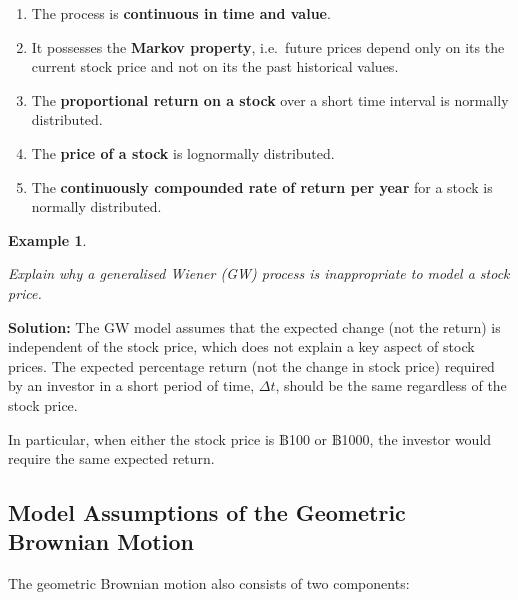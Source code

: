 \documentclass[
]{book}
\theoremstyle{definition}
\theoremstyle{definition}
\newtheorem{example}{Example}[chapter]
\theoremstyle{definition}
\theoremstyle{definition}
\theoremstyle{remark}
\begin{document}
\begin{enumerate}
\def\labelenumi{\arabic{enumi}.}
\item
  The process is \textbf{continuous in time and value}.
\item
  It possesses the \textbf{Markov property}, i.e.~future prices depend only
  on its the current stock price and not on its the past historical
  values.
\item
  The \textbf{proportional return on a stock} over a short time interval is
  normally distributed.
\item
  The \textbf{price of a stock} is lognormally distributed.
\item
  The \textbf{continuously compounded rate of return per year} for a stock
  is normally distributed.
\end{enumerate}

\begin{example}
\protect\hypertarget{exm:unlabeled-div-78}{}\label{exm:unlabeled-div-78}

\emph{Explain why a generalised Wiener (GW) process is inappropriate to model
a stock price.}

\end{example}

\textbf{Solution:} The GW model assumes that the expected change (not the
return) is independent of the stock price, which does not explain a key
aspect of stock prices. The expected percentage return (not the change
in stock price) required by an investor in a short period of time,
\(\Delta t\), should be the same regardless of the stock price.

In particular, when either the stock price is ฿100 or ฿1000, the
investor would require the same expected return.

\hypertarget{model-assumptions-of-the-geometric-brownian-motion}{%
\subsection{Model Assumptions of the Geometric Brownian Motion}\label{model-assumptions-of-the-geometric-brownian-motion}}

The geometric Brownian motion also consists of two components:
\end{document}
